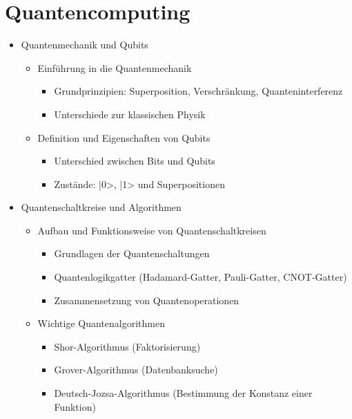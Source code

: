 \section{Quantencomputing}
\begin{itemize}
    \item Quantenmechanik und Qubits
        \begin{itemize}
            \item Einführung in die Quantenmechanik
                \begin{itemize}
                    \item Grundprinzipien: Superposition, Verschränkung, Quanteninterferenz
                    \item Unterschiede zur klassischen Physik
                \end{itemize}
            \item Definition und Eigenschaften von Qubits
                \begin{itemize}
                    \item Unterschied zwischen Bits und Qubits
                    \item Zustände: |0>, |1> und Superpositionen
                \end{itemize}
        \end{itemize}
    \item Quantenschaltkreise und Algorithmen
        \begin{itemize}
            \item Aufbau und Funktionsweise von Quantenschaltkreisen
                \begin{itemize}
                    \item Grundlagen der Quantenschaltungen
                    \item Quantenlogikgatter (Hadamard-Gatter, Pauli-Gatter, CNOT-Gatter)
                    \item Zusammensetzung von Quantenoperationen
                \end{itemize}
            \item Wichtige Quantenalgorithmen
                \begin{itemize}
                    \item Shor-Algorithmus (Faktorisierung)
                    \item Grover-Algorithmus (Datenbanksuche)
                    \item Deutsch-Jozsa-Algorithmus (Bestimmung der Konstanz einer Funktion)
                \end{itemize}

\end{itemize}
\end{itemize}
